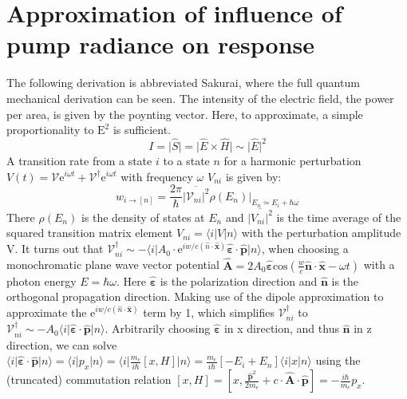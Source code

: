 \documentclass[twoside,openright]{scrreprt}
\begin{document}
{\section{Approximation of influence of pump radiance on response}\label{deriv:RadianceResponse}
The following derivation is abbreviated Sakurai\cite[chapter 5.7-5.8]{Sakurai_Napolitano_2017}, where the full quantum mechanical derivation can be seen.
The intensity of the electric field, the power per area, is given by the poynting vector. Here, to approximate, a simple proportionality to  $\mathrm{E^2}$ is sufficient.
\begin{equation*}
I =  \lvert  \hat{S} \rvert =  \lvert \hat{E} \times \hat{H} \rvert  \sim \lvert \hat{E} \rvert^2
\end{equation*}
A transition rate from a state $i$ to a state $n$ for a harmonic  perturbation $V(t) = \mathcal{V}\mathrm{e}^{i\omega t} + \mathcal{V}^\dagger \mathrm{e}^{i\omega t}$ with frequency $\omega$ $V_{ni}$ is given by:\cite[chapter 5.7]{Sakurai_Napolitano_2017}
\begin{equation}\label{eq:transitionRate}
w_{i\rightarrow [n]} = \frac{2\pi}{\hbar}\overline{\lvert \mathcal{V}_{ni}\rvert^2}\rho(E_n)\vert_{E_n \simeq E_i + \hbar\omega}
\end{equation}
There $\rho(E_n)$ is the density of states at $E_n$ and $\overline{\lvert V_{ni}\rvert^2}$ is the time average of the squared transition matrix element $V_{ni} = \langle i\lvert V\rvert n \rangle$ with the perturbation amplitude V. %
It turns out that $\mathcal{V}^\dagger_{ni} \sim -\langle i\lvert A_0\cdot \mathrm{e}^{iw/c\left(\hat{n}\cdot\mathbf{\hat{x}}\right)} \mathbf{\hat{\varepsilon}}\cdot\mathbf{\hat{p}}\rvert n \rangle$, when choosing a monochromatic plane wave vector potential $\mathbf{\hat{A}} = 2A_0\mathbf{\hat{\varepsilon}}\mathrm{cos}\left(\frac{w}{c}\mathbf{\hat{n}\cdot \hat{x}}-\omega t\right)$ with a photon energy  $E =\hbar\omega$. Here $\mathbf{\hat{\varepsilon}}$ is the polarization direction and $\mathbf{\hat{n}}$ is the orthogonal propagation direction.\cite[chapter 5.7-5.8]{Sakurai_Napolitano_2017}
Making use of the dipole approximation to approximate the $\mathrm{e}^{iw/c\left(\hat{n}\cdot\mathbf{\hat{x}}\right)}$ term by 1, which simplifies $\mathcal{V}^\dagger_{ni}$ to $\mathcal{V}^\dagger_{ni} \sim -A_0\langle i\lvert \mathbf{\hat{\varepsilon}}\cdot\mathbf{\hat{p}}\rvert n \rangle$. Arbitrarily choosing $\mathbf{\hat{\varepsilon}}$ in x direction, and thus $\mathbf{\hat{n}}$ in z direction, we can solve $\langle i\lvert \mathbf{\hat{\varepsilon}}\cdot\mathbf{\hat{p}}\rvert n \rangle = \langle i\lvert p_x\rvert n \rangle = \langle i\lvert \frac{m_e}{i\hbar}\left[x,H\right]\rvert n \rangle = \frac{m_e}{i\hbar} \left[-E_i + E_n\right]\langle i\lvert x\rvert n \rangle$ using the (truncated) commutation relation $[x, H] = [x, \frac{\mathbf{\hat{p}}^2}{2m_e} + c\cdot\mathbf{\hat{A}}\cdot \mathbf{\hat{p}}] = -\frac{i\hbar}{m_e} p_x$.\\
}
\end{document}
